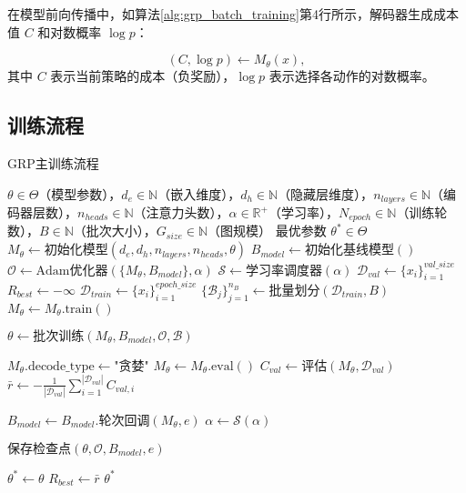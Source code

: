 \documentclass[AutoFakeBold]{LZUThesis}
\begin{document}
在模型前向传播中，如算法\ref{alg:grp_batch_training}第4行所示，解码器生成成本值 $C$ 和对数概率 $\log p$：

\begin{equation}
	(C, \log p) \leftarrow M_{\theta}(x),
\end{equation}
其中 $C$ 表示当前策略的成本（负奖励），$\log p$ 表示选择各动作的对数概率。

\subsection{训练流程}
\begin{algorithm}[H]
	\begin{algorithmic}[1]
		\caption{GRP主训练流程}
		\label{alg:grp_main_training}
		\Require $\theta \in \Theta$（模型参数），$d_e \in \mathbb{N}$（嵌入维度），$d_h \in \mathbb{N}$（隐藏层维度），$n_{layers} \in \mathbb{N}$（编码器层数），$n_{heads} \in \mathbb{N}$（注意力头数），$\alpha \in \mathbb{R}^{+}$（学习率），$N_{epoch} \in \mathbb{N}$（训练轮数），$B \in \mathbb{N}$（批次大小），$G_{size} \in \mathbb{N}$（图规模）
		\Ensure 最优参数 $\theta^* \in \Theta$
		\State $M_{\theta} \leftarrow \text{初始化模型}(d_e, d_h, n_{layers}, n_{heads}, \theta)$
		\State $B_{model} \leftarrow \text{初始化基线模型}()$
		\State $\mathcal{O} \leftarrow \text{Adam优化器}(\{M_{\theta}, B_{model}\}, \alpha)$
		\State $\mathcal{S} \leftarrow \text{学习率调度器}(\alpha)$
		\State $\mathcal{D}_{val} \leftarrow \{x_i\}_{i=1}^{val\_size}$ 
		\State $R_{best} \leftarrow -\infty$ 
		\State $\mathcal{D}_{train} \leftarrow \{x_i\}_{i=1}^{epoch\_size}$ 
		\State $\{\mathcal{B}_j\}_{j=1}^{n_B} \leftarrow \text{批量划分}(\mathcal{D}_{train}, B)$
		\State $M_{\theta} \leftarrow M_{\theta}.\text{train}()$ 

		\State $\theta \leftarrow \text{批次训练}(M_{\theta}, B_{model}, \mathcal{O}, \mathcal{B})$ 
		\EndFor

		\State $M_{\theta}.\text{decode\_type} \leftarrow \text{"贪婪"}$
		\State $M_{\theta} \leftarrow M_{\theta}.\text{eval}()$
		\State $C_{val} \leftarrow \text{评估}(M_{\theta}, \mathcal{D}_{val})$
		\State $\bar{r} \leftarrow -\frac{1}{|\mathcal{D}_{val}|}\sum_{i=1}^{|\mathcal{D}_{val}|} C_{val,i}$ 

		\State $B_{model} \leftarrow B_{model}.\text{轮次回调}(M_{\theta}, e)$
		\State $\alpha \leftarrow \mathcal{S}(\alpha)$ 

		\State $\text{保存检查点}(\theta, \mathcal{O}, B_{model}, e)$
		\EndIf

		\State $\theta^* \leftarrow \theta$ 
		\State $R_{best} \leftarrow \bar{r}$
		\EndIf
		\EndFor
		\State \Return $\theta^*$
	\end{algorithmic}
\end{algorithm}
\end{document}
